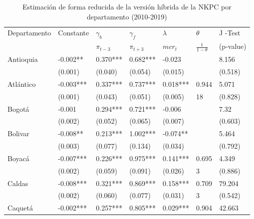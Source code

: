 \begin{table}[H]
\centering
\caption{Estimación de forma reducida de la versión híbrida de la NKPC por departamento (2010-2019)}
\begin{tabular}{lllllll}
\hline
Departamento & Constante  & $\gamma_{b}$  & $\gamma_{f}$ & $\lambda$   & $\theta$ & J -Test \\
 &       &   $\pi_{t-3}$    &    $\pi_{t+3}$    &  $mcr_{t}$    &   $\frac{1}{1-\theta}$    & (p-value) \\
\hline
\hline
\vspace{-0.3cm} Antioquia & -0.002** & 0.370*** & 0.682*** & -0.023 &       & 8.156\\   
 & \scriptsize{(0.001)} & \scriptsize{(0.040)} & \scriptsize{(0.054)} & \scriptsize{(0.015)} &       & \scriptsize{(0.518)} \\
\vspace{-0.3cm} Atlántico & -0.003*** & 0.337*** & 0.737*** & 0.018*** & 0.944 & 5.071\\   
& \scriptsize{(0.001)} & \scriptsize{(0.043)} & \scriptsize{(0.051)} & \scriptsize{(0.005)} & \scriptsize{18}    & \scriptsize{(0.828)} \\
\vspace{-0.3cm} Bogotá & -0.001 & 0.294*** & 0.721*** & -0.006 &       & 7.32 \\  
& \scriptsize{(0.002)} & \scriptsize{(0.052)} & \scriptsize{(0.065)} & \scriptsize{(0.007)} &       & \scriptsize{(0.603)} \\
\vspace{-0.3cm} Bolivar & -0.008** &	0.213***  &	1.002*** &	-0.074** &  & 5.464\\   
& \scriptsize{(0.003)} & \scriptsize{(0.077)} & \scriptsize{(0.134)} & \scriptsize{(0.034)} &     & \scriptsize{(0.792)} \\ 
\vspace{-0.3cm} Boyacá & -0.007*** & 0.226*** & 0.975*** & 0.141*** & 0.695 & 4.349\\   
& \scriptsize{(0.002)} & \scriptsize{(0.059)} & \scriptsize{(0.091)} & \scriptsize{(0.026)} & \scriptsize{3}     & \scriptsize{(0.886)} \\
\vspace{-0.3cm} Caldas & -0.008*** & 0.321*** & 0.869*** & 0.158*** & 0.709 & 79.204\\   
& \scriptsize{(0.002)} & \scriptsize{(0.060)} & \scriptsize{(0.077)} & \scriptsize{(0.031)} & \scriptsize{3}     & \scriptsize{(0.542)} \\
\vspace{-0.3cm} Caquetá & -0.002*** & 0.257*** & 0.805*** & 0.029*** & 0.904 & 42.663\\   

\end{tabular}
\end{table}
